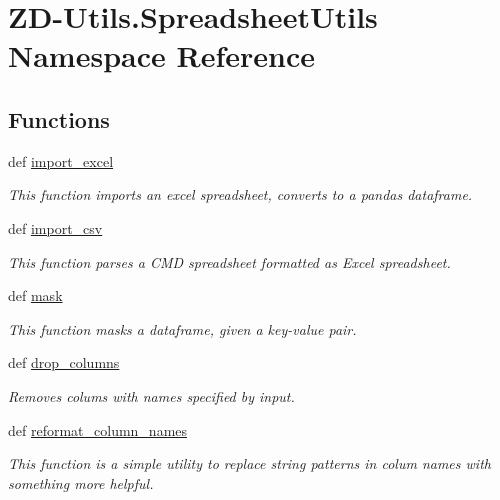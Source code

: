 \hypertarget{namespace_z_d-_utils_1_1_spreadsheet_utils}{\section{Z\-D-\/\-Utils.Spreadsheet\-Utils Namespace Reference}
\label{namespace_z_d-_utils_1_1_spreadsheet_utils}
}
\subsection*{Functions}
\begin{DoxyCompactItemize}
\item 
def \hyperlink{namespace_z_d-_utils_1_1_spreadsheet_utils_a5316952afccec63c5c52677314b5b9bb}{import\-\_\-excel}
\begin{DoxyCompactList}\small\item\em This function imports an excel spreadsheet, converts to a pandas dataframe. \end{DoxyCompactList}\item 
def \hyperlink{namespace_z_d-_utils_1_1_spreadsheet_utils_af60319a614aa4bc3f09807cddabf0352}{import\-\_\-csv}
\begin{DoxyCompactList}\small\item\em This function parses a C\-M\-D spreadsheet formatted as Excel spreadsheet. \end{DoxyCompactList}\item 
def \hyperlink{namespace_z_d-_utils_1_1_spreadsheet_utils_a0c5b617043b3f8f6c48bb9d56003ba13}{mask}
\begin{DoxyCompactList}\small\item\em This function masks a dataframe, given a key-\/value pair. \end{DoxyCompactList}\item 
def \hyperlink{namespace_z_d-_utils_1_1_spreadsheet_utils_a29c2c3c65a9eac2b8bbcfcd400abb7cb}{drop\-\_\-columns}
\begin{DoxyCompactList}\small\item\em Removes colums with names specified by input. \end{DoxyCompactList}\item 
def \hyperlink{namespace_z_d-_utils_1_1_spreadsheet_utils_a698b6451f73e945b5f7ed3c6d5b42376}{reformat\-\_\-column\-\_\-names}
\begin{DoxyCompactList}\small\item\em This function is a simple utility to replace string patterns in colum names with something more helpful. \end{DoxyCompactList}\end{DoxyCompactItemize}


